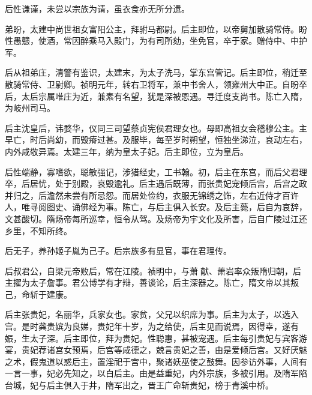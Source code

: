 \documentclass[]{article}
\begin{document}
后性谦谨，未尝以宗族为请，虽衣食亦无所分遗。

弟盼，太建中尚世祖女富阳公主，拜驸马都尉。后主即位，以帝舅加散骑常侍。盼性愚戆，使酒，常因醉乘马入殿门，为有司所劾，坐免官，卒于家。赠侍中、中护军。

后从祖弟庄，清警有鉴识，太建末，为太子洗马，掌东宫管记。后主即位，稍迁至散骑常侍、卫尉卿。祯明元年，转右卫将军，兼中书舍人，领雍州大中正。自盼卒后，太后宗属唯庄为近，兼素有名望，犹是深被恩遇。寻迁度支尚书。陈亡入隋，为岐州司马。

后主沈皇后，讳婺华，仪同三司望蔡贞宪侯君理女也。母即高祖女会稽穆公主。主早亡，时后尚幼，而毁瘠过甚。及服毕，每至岁时朔望，恒独坐涕泣，哀动左右，内外咸敬异焉。太建三年，纳为皇太子妃。后主即位，立为皇后。

后性端静，寡嗜欲，聪敏强记，涉猎经史，工书翰。初，后主在东宫，而后父君理卒，后居忧，处于别殿，哀毁逾礼。后主遇后既薄，而张贵妃宠倾后宫，后宫之政并归之，后澹然未尝有所忌怨。而居处俭约，衣服无锦绣之饰，左右近侍才百许人，唯寻阅图史、诵佛经为事。陈亡，与后主俱入长安。及后主薨，后自为哀辞，文甚酸切。隋炀帝每所巡幸，恒令从驾。及炀帝为宇文化及所害，后自广陵过江还乡里，不知所终。

后无子，养孙姬子胤为己子。后宗族多有显官，事在君理传。

后叔君公，自梁元帝败后，常在江陵。祯明中，与萧献、萧岩率众叛隋归朝，后主擢为太子詹事。君公博学有才辩，善谈论，后主深器之。陈亡，隋文帝以其叛己，命斩于建康。

后主张贵妃，名丽华，兵家女也。家贫，父兄以织席为事。后主为太子，以选入宫。是时龚贵嫔为良娣，贵妃年十岁，为之给使，后主见而说焉，因得幸，遂有娠，生太子深。后主即位，拜为贵妃。性聪惠，甚被宠遇。后主每引贵妃与宾客游宴，贵妃荐诸宫女预焉，后宫等咸德之，兢言贵妃之善，由是爱倾后宫。又好厌魅之术，假鬼道以惑后主，置淫祀于宫中，聚诸妖巫使之鼓舞。因参访外事，人间有一言一事，妃必先知之，以白后主。由是益重妃，内外宗族，多被引用。及隋军陷台城，妃与后主俱入于井，隋军出之，晋王广命斩贵妃，榜于青溪中桥。
\end{document}
